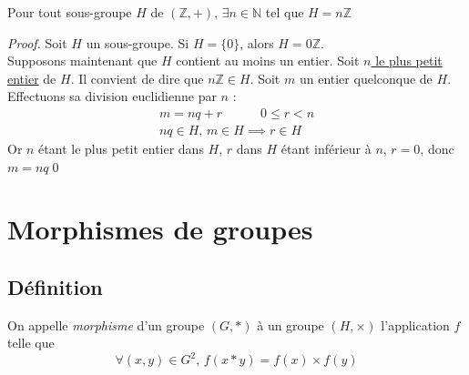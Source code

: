 \documentclass[11pt,a4paper,fleqn,pdftex]{report}
\begin{document}
\begin{itheorem}\label{thm:sous_groupe_de_Z}
     Pour tout sous-groupe $H$ de $\left( \mathbb{Z},+ \right),\,\exists n\in \mathbb{N}$ tel que $H=n\mathbb{Z}$
\end{itheorem}
\begin{proof}
     Soit $H$ un sous-groupe. Si $H=\lbrace 0 \rbrace$, alors $H=0\mathbb{Z}$.\\
     Supposons maintenant que $H$ contient au moins un entier. \newline
     Soit \uline{$n$ le plus petit entier} de $H$. Il convient de dire que $n\mathbb{Z}\in H$. \newline
     Soit $m$ un entier quelconque de $H$. Effectuons sa division euclidienne par $n$ : 
     \begin{gather*}
         m = nq+r \quad\quad\quad 0\le r < n \\
         nq\in H,\, m\in H \implies \boxed{r\in H}
     \end{gather*}
     Or $n$ étant le plus petit entier dans $H$, $r$ dans $H$ étant inférieur à $n$, $r=0$, donc $m=nq$\qed
\end{proof}
\section{Morphismes de groupes} %
\label{sec:morphismes_de_groupes}
\subsection{Définition} %
\label{sub:morphismes_de_groupe_definition}
\begin{dfn}
     On appelle \emph{morphisme} d'un groupe $(G,*)$ à un groupe $(H,\times )$ l'application $f$ telle que
     \begin{equation}
     \forall (x,y) \in G^2,\, f \left( x*y \right) = f(x)\times  f(y)
     \end{equation}
\end{dfn}
\end{document}
